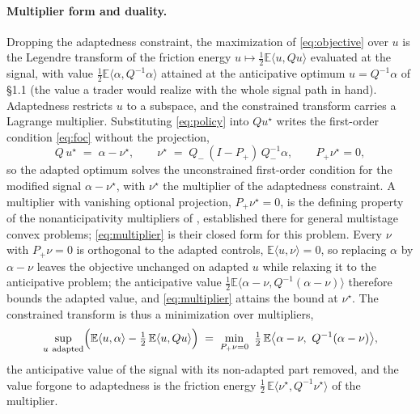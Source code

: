\documentclass[11pt]{article}
\newcommand{\E}{\mathbb{E}}
\theoremstyle{plain}
\begin{document}
\paragraph{Multiplier form and duality.} Dropping the adaptedness constraint, the maximization of \eqref{eq:objective} over $u$ is the Legendre transform of the friction energy $u\mapsto\tfrac12\E\langle u,Qu\rangle$ evaluated at the signal, with value $\tfrac12\E\langle\alpha,Q^{-1}\alpha\rangle$ attained at the anticipative optimum $u=Q^{-1}\alpha$ of \S1.1 (the value a trader would realize with the whole signal path in hand). Adaptedness restricts $u$ to a subspace, and the constrained transform carries a Lagrange multiplier. Substituting \eqref{eq:policy} into $Qu^\star$ writes the first-order condition \eqref{eq:foc} without the projection,
\begin{equation}\label{eq:multiplier}
Q\,u^\star \;=\; \alpha - \nu^\star, \qquad \nu^\star \;=\; Q_-\,(I-P_+)\,Q_-^{-1}\alpha, \qquad P_+\nu^\star = 0,
\end{equation}
so the adapted optimum solves the unconstrained first-order condition for the modified signal $\alpha-\nu^\star$, with $\nu^\star$ the multiplier of the adaptedness constraint. A multiplier with vanishing optional projection, $P_+\nu^\star=0$, is the defining property of the nonanticipativity multipliers of \citet{RockafellarWets1976}, established there for general multistage convex problems; \eqref{eq:multiplier} is their closed form for this problem. Every $\nu$ with $P_+\nu=0$ is orthogonal to the adapted controls, $\E\langle u,\nu\rangle=0$, so replacing $\alpha$ by $\alpha-\nu$ leaves the objective unchanged on adapted $u$ while relaxing it to the anticipative problem; the anticipative value $\tfrac12\E\langle\alpha-\nu,Q^{-1}(\alpha-\nu)\rangle$ therefore bounds the adapted value, and \eqref{eq:multiplier} attains the bound at $\nu^\star$. The constrained transform is thus a minimization over multipliers,
\begin{equation}\label{eq:dual}
\sup_{u\ \text{adapted}} \Bigl(\E\langle u,\alpha\rangle - \tfrac12\,\E\langle u,Qu\rangle\Bigr)
\;=\; \min_{P_+\nu = 0}\ \tfrac12\,\E\bigl\langle \alpha-\nu,\ Q^{-1}(\alpha-\nu)\bigr\rangle,
\end{equation}
the anticipative value of the signal with its non-adapted part removed, and the value forgone to adaptedness is the friction energy $\tfrac12\,\E\langle\nu^\star,Q^{-1}\nu^\star\rangle$ of the multiplier.
\end{document}
